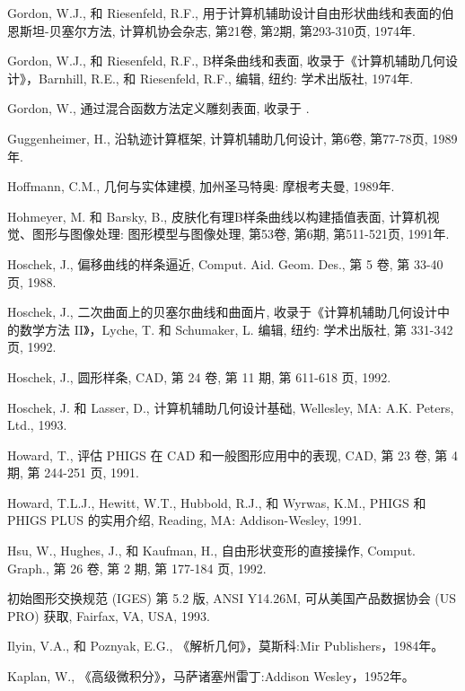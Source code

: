 \documentclass[../main.tex]{subfiles}
\begin{document}
\begin{BookBibliography}
 Gordon, W.J., 和 Riesenfeld, R.F., 用于计算机辅助设计自由形状曲线和表面的伯恩斯坦-贝塞尔方法, 计算机协会杂志, 第21卷, 第2期, 第293-310页, 1974年.

 Gordon, W.J., 和 Riesenfeld, R.F., B样条曲线和表面, 收录于《计算机辅助几何设计》，Barnhill, R.E., 和 Riesenfeld, R.F., 编辑, 纽约: 学术出版社, 1974年.

 Gordon, W., 通过混合函数方法定义雕刻表面, 收录于 \cite{Pieg93}.

 Guggenheimer, H., 沿轨迹计算框架, 计算机辅助几何设计, 第6卷, 第77-78页, 1989年.

 Hoffmann, C.M., 几何与实体建模, 加州圣马特奥: 摩根考夫曼, 1989年.

 Hohmeyer, M. 和 Barsky, B., 皮肤化有理B样条曲线以构建插值表面, 计算机视觉、图形与图像处理: 图形模型与图像处理, 第53卷, 第6期, 第511-521页, 1991年.

 Hoschek, J., 偏移曲线的样条逼近, Comput. Aid. Geom. Des., 第 5 卷, 第 33-40 页, 1988.

 Hoschek, J., 二次曲面上的贝塞尔曲线和曲面片, 收录于《计算机辅助几何设计中的数学方法 II》，Lyche, T. 和 Schumaker, L. 编辑, 纽约: 学术出版社, 第 331-342 页, 1992.

 Hoschek, J., 圆形样条, CAD, 第 24 卷, 第 11 期, 第 611-618 页, 1992.

 Hoschek, J. 和 Lasser, D., 计算机辅助几何设计基础, Wellesley, MA: A.K. Peters, Ltd., 1993.

 Howard, T., 评估 PHIGS 在 CAD 和一般图形应用中的表现, CAD, 第 23 卷, 第 4 期, 第 244-251 页, 1991.

 Howard, T.L.J., Hewitt, W.T., Hubbold, R.J., 和 Wyrwas, K.M., PHIGS 和 PHIGS PLUS 的实用介绍, Reading, MA: Addison-Wesley, 1991.

 Hsu, W., Hughes, J., 和 Kaufman, H., 自由形状变形的直接操作, Comput. Graph., 第 26 卷, 第 2 期, 第 177-184 页, 1992.

 初始图形交换规范 (IGES) 第 5.2 版, ANSI Y14.26M, 可从美国产品数据协会 (US PRO) 获取, Fairfax, VA, USA, 1993.

 Ilyin, V.A., 和 Poznyak, E.G., 《解析几何》，莫斯科:Mir Publishers，1984年。

 Kaplan, W., 《高级微积分》，马萨诸塞州雷丁:Addison Wesley，1952年。


\end{BookBibliography}
\end{document}
